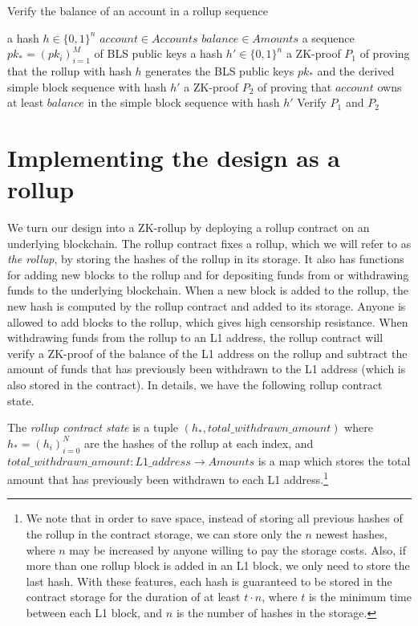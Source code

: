 \begin{circuit}[H]
\caption{Verify the balance of an account in a rollup sequence}\label{alg:balance-proof-rollup}
\begin{algorithmic}[1]
\Public
  \Statex a hash \(h \in \{0,1\}^n\)
  \Statex \(account \in Accounts\)
  \Statex \(balance \in Amounts\)
\Private
  \Statex a sequence \(pk_* = (pk_i)_{i=1}^M\) of BLS public keys
  \Statex a hash \(h' \in \{0,1\}^n\)
  \Statex a ZK-proof \(P_1\) of  proving that the rollup with hash \(h\) generates the BLS public keys \(pk_*\) and the derived simple block sequence with hash \(h'\)
  \Statex a ZK-proof \(P_2\) of  proving that \(account\) owns at least \(balance\) in the simple block sequence with hash \(h'\)
\State Verify \(P_1\) and \(P_2\)
\end{algorithmic}
\end{circuit}

\section{Implementing the design as a rollup}\label{section:rollup-contract}

We turn our design into a ZK-rollup by deploying a rollup contract on an underlying blockchain. The rollup contract fixes a rollup, which we will refer to as \emph{the rollup}, by storing the hashes of the rollup in its storage. It also has functions for adding new blocks to the rollup and for depositing funds from or withdrawing funds to the underlying blockchain. When a new block is added to the rollup, the new hash is computed by the rollup contract and added to its storage. Anyone is allowed to add blocks to the rollup, which gives high censorship resistance. When withdrawing funds from the rollup to an L1 address, the rollup contract will verify a ZK-proof of the balance of the L1 address on the rollup and subtract the amount of funds that has previously been withdrawn to the L1 address (which is also stored in the contract). In details, we have the following rollup contract state.

\begin{defn}
  The \emph{rollup contract state} is a tuple \((h_*,total\_withdrawn\_amount)\) where \(h_* = (h_i)_{i=0}^N\) are the hashes of the rollup at each index, and \(total\_withdrawn\_amount : L1\_address \rightarrow Amounts\) is a map which stores the total amount that has previously been withdrawn to each L1 address.\footnote{We note that in order to save space, instead of storing all previous hashes of the rollup in the contract storage, we can store only the \(n\) newest hashes, where \(n\) may be increased by anyone willing to pay the storage costs. Also, if more than one rollup block is added in an L1 block, we only need to store the last hash. With these features, each hash is guaranteed to be stored in the contract storage for the duration of at least \(t \cdot n\), where \(t\) is the minimum time between each L1 block, and \(n\) is the number of hashes in the storage.}
\end{defn}

